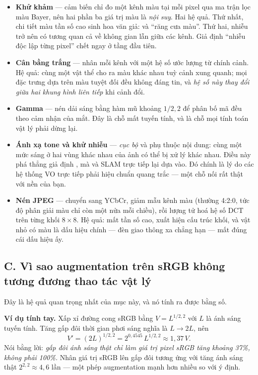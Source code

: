 \documentclass[../../../deep_learning.tex]{subfiles}
\begin{document}
\begin{itemize}
\item \textbf{Khử khảm} --- cảm biến chỉ đo một kênh màu tại mỗi pixel qua ma trận lọc màu Bayer, nên hai phần ba giá trị màu là \emph{nội suy}. Hai hệ quả. Thứ nhất, chi tiết màu tần số cao sinh hoa văn giả:  và ``răng cưa màu''. Thứ hai, nhiễu trở nên có tương quan cả về không gian lẫn giữa các kênh. Giả định ``nhiễu độc lập từng pixel'' chết ngay ở tầng đầu tiên.
\item \textbf{Cân bằng trắng} --- nhân mỗi kênh với một hệ số ước lượng từ chính cảnh. Hệ quả: cùng một vật thể cho ra màu khác nhau tuỳ cảnh xung quanh; mọi đặc trưng dựa trên màu tuyệt đối đều không đáng tin, và \emph{hệ số này thay đổi giữa hai khung hình liên tiếp} khi cảnh đổi.
\item \textbf{Gamma} --- nén dải sáng bằng hàm mũ khoảng \(1/2{,}2\) để phân bố mã đều theo cảm nhận của mắt. Đây là chỗ mất tuyến tính, và là chỗ mọi tính toán vật lý phải dừng lại.
\item \textbf{Ánh xạ tone và khử nhiễu} --- \emph{cục bộ} và phụ thuộc nội dung: cùng một mức sáng ở hai vùng khác nhau của ảnh có thể bị xử lý khác nhau. 
Điều này phá thẳng giả định , mà  và SLAM trực tiếp lại dựa vào. Đó chính là lý do các hệ thống VO trực tiếp phải hiệu chuẩn quang trắc --- một chỗ nối rất thật với nền của bạn.
\item \textbf{Nén JPEG} --- chuyển sang YCbCr, giảm mẫu kênh màu (thường 4:2:0, tức độ phân giải màu chỉ còn một nửa mỗi chiều), rồi lượng tử hoá hệ số DCT trên từng khối \(8\times8\). Hệ quả: mất tần số cao, xuất hiện cấu trúc khối, và vật nhỏ có màu là dấu hiệu chính --- đèn giao thông xa chẳng hạn --- mất đúng cái dấu hiệu ấy.
\end{itemize}

\subsection{C. Vì sao augmentation trên sRGB không tương đương thao tác vật lý}
Đây là hệ quả quan trọng nhất của mục này, và nó tính ra được bằng số.

\textbf{Ví dụ tính tay.} Xấp xỉ đường cong sRGB bằng \(V = L^{1/2{,}2}\) với \(L\) là ánh sáng tuyến tính. Tăng gấp đôi thời gian phơi sáng nghĩa là \(L \to 2L\), nên
\[
V' = (2L)^{1/2{,}2} = 2^{0{,}4545}\,L^{1/2{,}2} \approx 1{,}37\,V .
\]
Nói bằng lời: \emph{gấp đôi ánh sáng thật chỉ làm giá trị pixel sRGB tăng khoảng 37\%, không phải 100\%.} Nhân giá trị sRGB lên gấp đôi tương ứng với tăng ánh sáng thật \(2^{2{,}2}\approx 4{,}6\) lần --- một phép augmentation mạnh hơn nhiều so với ý định.
\end{document}
